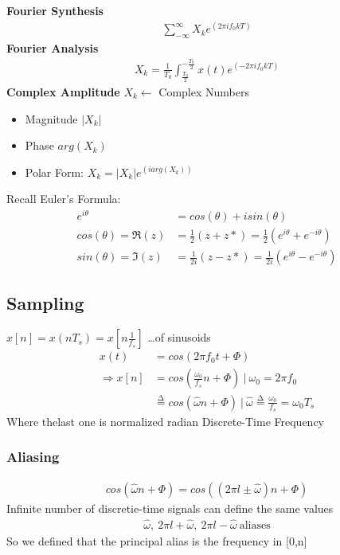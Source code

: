 \documentclass{article}
\begin{document}
            \textbf{Fourier Synthesis}
                \begin{align}
                    \sum_{-\infty}^{\infty}{X_k e^(2\pi i f_0 k T)}
                \end{align}
            \textbf{Fourier Analysis}
                \begin{align}
                    X_k = \frac{1}{T_0}\int_{\frac{T_0}{2}}^{-\frac{T_0}{2}}{x(t)e^(-2\pi i f_0 k T)}
                \end{align}
            \textbf{Complex Amplitude}
                $X_k\leftarrow$ Complex Numbers
                \renewcommand{\labelitemi}{\textendash}
                \begin{itemize}
                    \item Magnitude $|X_k|$
                    \item Phase $arg(X_k)$
                    \item Polar Form: $X_k = |X_k|e^(iarg(X_k))$
                \end{itemize}
                Recall Euler's Formula:
                \begin{align}
                    e^{i\theta} &= cos(\theta) + isin(\theta)\\
                    cos(\theta) = \Re(z) &= \frac{1}{2} (z+z*) = \frac{1}{2}(e^{i\theta} + e^{-i\theta})\\
                    sin(\theta) = \Im(z)&= \frac{1}{2i}(z-z*) = \frac{1}{2i}(e^{i\theta} - e^{-i\theta})
                \end{align}
                \renewcommand{\labelitemi}{\textbullet}
    \subsection{Sampling}
            $x[n] = x(nT_s) = x[n\frac{1}{f_s}]$ \dots of sinusoids
            \begin{align}
                x(t) &= cos(2 \pi f_0 t + \Phi)\\
                \Rightarrow x[n] &= cos(\frac{\omega_0}{f_s}n + \Phi)~|~\omega_0 = 2\pi f_0\\
                &\overset{\mathrm{\Delta}}{=} cos(\hat{\omega}n + \Phi)~|~
                    \hat{\omega} \overset{\mathrm{\Delta}}{=} \frac{\omega_0}{f_s} = \omega_0 T_s
            \end{align}
            Where thelast one is normalized radian Discrete-Time Frequency
                \subsubsection{Aliasing}
                \begin{align}
                    cos(\hat{\omega}n + \Phi) = cos((2\pi l\pm\hat{\omega})n + \Phi)
                \end{align}
                    Infinite number of discretie-time signals can define the same values
                \begin{align}
                    \hat{\omega},~2\pi l + \hat{\omega},~2\pi l - \hat{\omega}~\text{aliases}
                \end{align}
                    So we defined that the principal alias is the frequency in [0,n]
\end{document}
